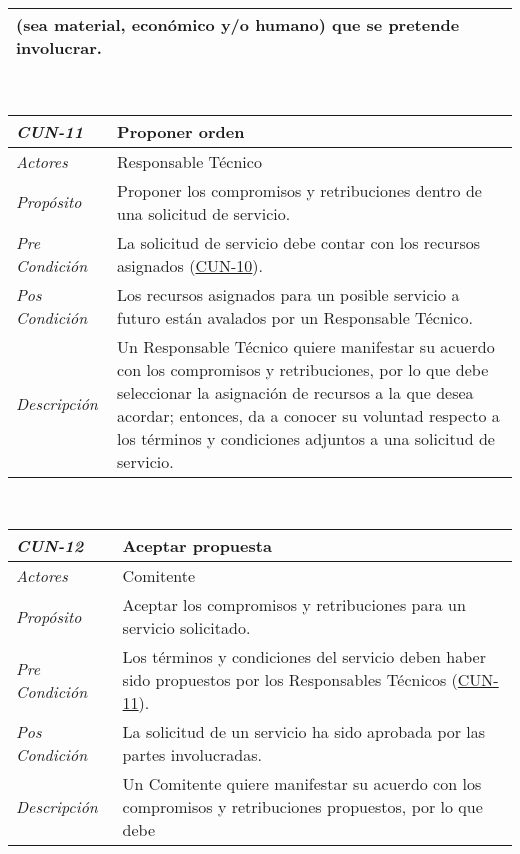 \begin{center}
{\begin{tabular}{ | p{3cm} | p{12.5cm} | }
	(sea material, econ\'omico y/o humano) que se pretende
	involucrar. \\
	\hline
\end{tabular}} \\[1cm]
\hypertarget{CUN-11}{%
\begin{tabular}{ | p{3cm} | p{12.5cm} | }
	\hline
	\rowcolor{lightgray}
	\hfil \textbf{\textit{CUN-11}} &
	\hfil \textbf{Proponer orden} \\
	\hline
	\raggedleft \textit{Actores} & Responsable T\'ecnico \\
	\hline
	\raggedleft \textit{Prop\'osito} & Proponer los
	compromisos y retribuciones dentro de una solicitud
	de servicio. \\
	\hline
	\raggedleft \textit{Pre Condici\'on} & La solicitud
	de servicio debe contar con los recursos asignados
	(\hyperlink{CUN-10}{CUN-10}). \\
	\hline
	\raggedleft \textit{Pos Condici\'on} & Los recursos
	asignados para un posible servicio a futuro est\'an
	avalados por un Responsable T\'ecnico. \\
	\hline
	\raggedleft \textit{Descripci\'on} &
	Un Responsable T\'ecnico quiere manifestar su acuerdo
	con los compromisos y retribuciones, por lo que debe
	seleccionar la asignaci\'on de recursos a la que
	desea acordar; entonces, da a conocer su voluntad
	respecto a los t\'erminos y condiciones adjuntos a una
	solicitud de servicio. \\
	\hline
\end{tabular}} \\[1cm]
\hypertarget{CUN-12}{%
\begin{tabular}{ | p{3cm} | p{12.5cm} | }
	\hline
	\rowcolor{lightgray}
	\hfil \textbf{\textit{CUN-12}} &
	\hfil \textbf{Aceptar propuesta} \\
	\hline
	\raggedleft \textit{Actores} & Comitente \\
	\hline
	\raggedleft \textit{Prop\'osito} & Aceptar los
	compromisos y retribuciones para un servicio
	solicitado. \\
	\hline
	\raggedleft \textit{Pre Condici\'on} & Los t\'erminos
	y condiciones del servicio deben haber sido
	propuestos por los Responsables T\'ecnicos
	(\hyperlink{CUN-11}{CUN-11}). \\
	\hline
	\raggedleft \textit{Pos Condici\'on} & La solicitud
	de un servicio ha sido aprobada por las partes
	involucradas. \\
	\hline
	\raggedleft \textit{Descripci\'on} &
	Un Comitente quiere manifestar su acuerdo con los
	compromisos y retribuciones propuestos, por lo que debe

\end{tabular}}
\end{center}
